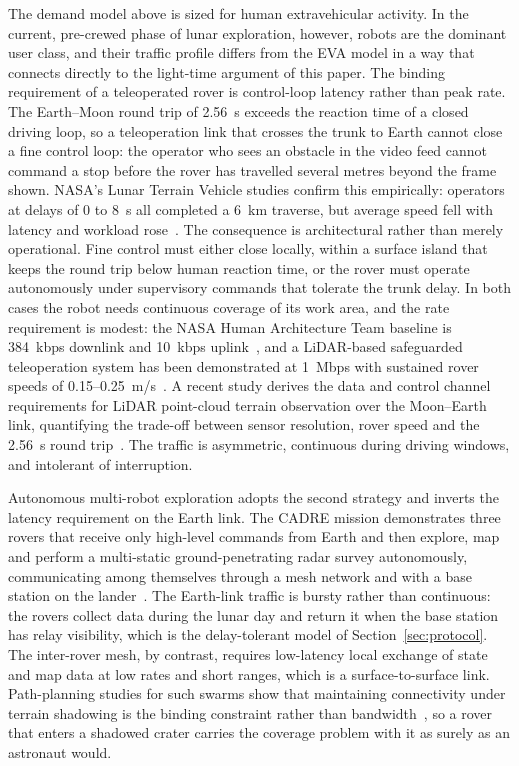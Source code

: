 \documentclass[11pt,a4paper]{article}
\begin{document}
The demand model above is sized for human extravehicular activity. In the current, pre-crewed phase of lunar exploration, however, robots are the dominant user class, and their traffic profile differs from the EVA model in a way that connects directly to the light-time argument of this paper. The binding requirement of a teleoperated rover is control-loop latency rather than peak rate. The Earth--Moon round trip of \SI{2.56}{\second} exceeds the reaction time of a closed driving loop, so a teleoperation link that crosses the trunk to Earth cannot close a fine control loop: the operator who sees an obstacle in the video feed cannot command a stop before the rover has travelled several metres beyond the frame shown. NASA's Lunar Terrain Vehicle studies confirm this empirically: operators at delays of \SI{0}{} to \SI{8}{\second} all completed a \SI{6}{km} traverse, but average speed fell with latency and workload rose~\cite{ltv_teleops2025}. The consequence is architectural rather than merely operational. Fine control must either close locally, within a surface island that keeps the round trip below human reaction time, or the rover must operate autonomously under supervisory commands that tolerate the trunk delay. In both cases the robot needs continuous coverage of its work area, and the rate requirement is modest: the NASA Human Architecture Team baseline is \SI{384}{kbps} downlink and \SI{10}{kbps} uplink~\cite{lidar_teleops2012}, and a LiDAR-based safeguarded teleoperation system has been demonstrated at \SI{1}{Mbps} with sustained rover speeds of \SI{0.15}{}--\SI{0.25}{m/s}~\cite{lidar_teleops2012}. A recent study derives the data and control channel requirements for LiDAR point-cloud terrain observation over the Moon--Earth link, quantifying the trade-off between sensor resolution, rover speed and the \SI{2.56}{\second} round trip~\cite{lidar_networking2026}. The traffic is asymmetric, continuous during driving windows, and intolerant of interruption.

Autonomous multi-robot exploration adopts the second strategy and inverts the latency requirement on the Earth link. The CADRE mission demonstrates three rovers that receive only high-level commands from Earth and then explore, map and perform a multi-static ground-penetrating radar survey autonomously, communicating among themselves through a mesh network and with a base station on the lander~\cite{cadre_aero2024}. The Earth-link traffic is bursty rather than continuous: the rovers collect data during the lunar day and return it when the base station has relay visibility, which is the delay-tolerant model of Section~\ref{sec:protocol}. The inter-rover mesh, by contrast, requires low-latency local exchange of state and map data at low rates and short ranges, which is a surface-to-surface link. Path-planning studies for such swarms show that maintaining connectivity under terrain shadowing is the binding constraint rather than bandwidth~\cite{banfi_multirover2024}, so a rover that enters a shadowed crater carries the coverage problem with it as surely as an astronaut would.
\end{document}
